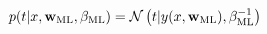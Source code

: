 $$p(t|x,{\bf w}_{\rm ML},\beta_{\rm ML})={\cal N}\left( t|y(x,{\bf w}_{\rm ML}), \beta_{\rm ML}^{-1} \right)$$
